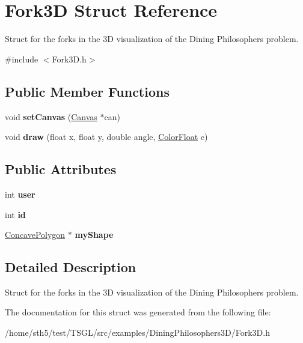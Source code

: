 \hypertarget{struct_fork3_d}{}\section{Fork3D Struct Reference}
\label{struct_fork3_d}


Struct for the forks in the 3D visualization of the Dining Philosophers\textquotesingle{} problem.  




{\ttfamily \#include $<$Fork3\+D.\+h$>$}

\subsection*{Public Member Functions}
\begin{DoxyCompactItemize}
\item 
\mbox{\label{struct_fork3_d_a2f341294fbd07eba8f81a4e5bfeb4e95}} 
void {\bfseries set\+Canvas} (\hyperlink{classtsgl_1_1_canvas}{Canvas} $\ast$can)
\item 
\mbox{\label{struct_fork3_d_aa745d8afac91a5a4ae335d8f1262ae6f}} 
void {\bfseries draw} (float x, float y, double angle, \hyperlink{structtsgl_1_1_color_float}{Color\+Float} c)
\end{DoxyCompactItemize}
\subsection*{Public Attributes}
\begin{DoxyCompactItemize}
\item 
\mbox{\label{struct_fork3_d_a2ac3101fcd371e6357fc25dcfb9ecbe3}} 
int {\bfseries user}
\item 
\mbox{\label{struct_fork3_d_abdf1bb4422ffdf7922024525aab94d67}} 
int {\bfseries id}
\item 
\mbox{\label{struct_fork3_d_a84c898115b60f9673152c88998463f60}} 
\hyperlink{classtsgl_1_1_concave_polygon}{Concave\+Polygon} $\ast$ {\bfseries my\+Shape}
\end{DoxyCompactItemize}


\subsection{Detailed Description}
Struct for the forks in the 3D visualization of the Dining Philosophers\textquotesingle{} problem. 

The documentation for this struct was generated from the following file\+:\begin{DoxyCompactItemize}
\item 
/home/sth5/test/\+T\+S\+G\+L/src/examples/\+Dining\+Philosophers3\+D/Fork3\+D.\+h\end{DoxyCompactItemize}
